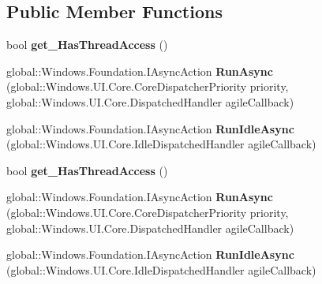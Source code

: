 \subsection*{Public Member Functions}
\begin{DoxyCompactItemize}
\item 
\mbox{\label{interface_windows_1_1_u_i_1_1_core_1_1_i_core_dispatcher_afa093aa300664f3cfede7c8fac27c3ec}} 
bool {\bfseries get\+\_\+\+Has\+Thread\+Access} ()
\item 
\mbox{\label{interface_windows_1_1_u_i_1_1_core_1_1_i_core_dispatcher_a466ce1d7a05e82289c0c50e1e6738da8}} 
global\+::\+Windows.\+Foundation.\+I\+Async\+Action {\bfseries Run\+Async} (global\+::\+Windows.\+U\+I.\+Core.\+Core\+Dispatcher\+Priority priority, global\+::\+Windows.\+U\+I.\+Core.\+Dispatched\+Handler agile\+Callback)
\item 
\mbox{\label{interface_windows_1_1_u_i_1_1_core_1_1_i_core_dispatcher_a58bf641f5f0e68594918acca63694bb4}} 
global\+::\+Windows.\+Foundation.\+I\+Async\+Action {\bfseries Run\+Idle\+Async} (global\+::\+Windows.\+U\+I.\+Core.\+Idle\+Dispatched\+Handler agile\+Callback)
\item 
\mbox{\label{interface_windows_1_1_u_i_1_1_core_1_1_i_core_dispatcher_afa093aa300664f3cfede7c8fac27c3ec}} 
bool {\bfseries get\+\_\+\+Has\+Thread\+Access} ()
\item 
\mbox{\label{interface_windows_1_1_u_i_1_1_core_1_1_i_core_dispatcher_a466ce1d7a05e82289c0c50e1e6738da8}} 
global\+::\+Windows.\+Foundation.\+I\+Async\+Action {\bfseries Run\+Async} (global\+::\+Windows.\+U\+I.\+Core.\+Core\+Dispatcher\+Priority priority, global\+::\+Windows.\+U\+I.\+Core.\+Dispatched\+Handler agile\+Callback)
\item 
\mbox{\label{interface_windows_1_1_u_i_1_1_core_1_1_i_core_dispatcher_a58bf641f5f0e68594918acca63694bb4}} 
global\+::\+Windows.\+Foundation.\+I\+Async\+Action {\bfseries Run\+Idle\+Async} (global\+::\+Windows.\+U\+I.\+Core.\+Idle\+Dispatched\+Handler agile\+Callback)

\end{DoxyCompactItemize}
